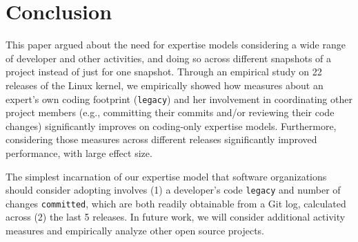 



\section{Conclusion}

This paper argued about the need for expertise models considering a wide range of developer and other activities, and doing so across different snapshots of a project instead of just for one snapshot. Through an empirical study on 22 releases of the Linux kernel, we empirically showed how measures about an expert's own coding footprint (\texttt{legacy}) and her involvement in coordinating other project members (e.g., committing their commits and/or reviewing their code changes) significantly improves on coding-only expertise models. Furthermore, considering those measures across different releases significantly improved performance, with large effect size.

The simplest incarnation of our expertise model that software organizations should consider adopting involves (1) a developer's code \texttt{legacy} and number of changes \texttt{committed}, which are both readily obtainable from a Git log, calculated across (2) the last 5 releases. In future work, we will consider additional activity measures and empirically analyze other open source projects.





